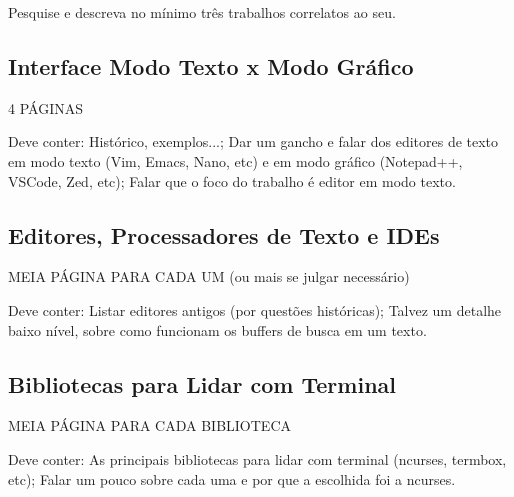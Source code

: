 Pesquise e descreva no mínimo três trabalhos correlatos ao seu.

\subsection{Interface Modo Texto x Modo Gráfico}

4 PÁGINAS

Deve conter: Histórico, exemplos...; Dar um gancho e falar dos editores de texto em modo texto (Vim, Emacs, Nano, etc)
e em modo gráfico (Notepad++, VSCode, Zed, etc); Falar que o foco do trabalho é editor  em modo texto.

\subsection{Editores, Processadores de Texto e IDEs}

MEIA PÁGINA PARA CADA UM (ou mais se julgar necessário)

Deve conter: Listar editores antigos (por questões históricas); Talvez um detalhe baixo nível, sobre como funcionam os buffers de busca
em um texto.

\subsection{Bibliotecas para Lidar com Terminal} %

MEIA PÁGINA PARA CADA BIBLIOTECA

Deve conter: As principais bibliotecas para lidar com terminal (ncurses, termbox, etc); Falar um pouco sobre cada uma e
por que a escolhida foi a ncurses.
